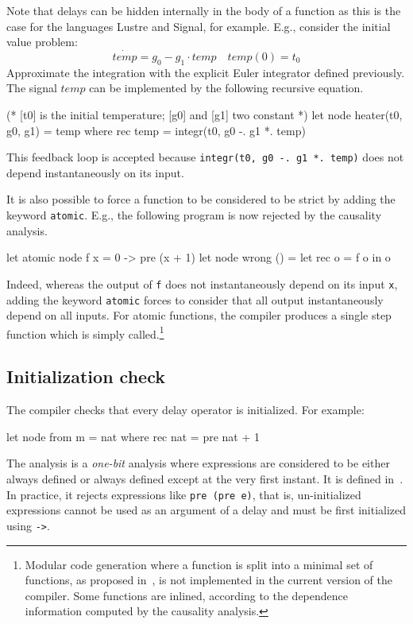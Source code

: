 \documentclass[11pt,titlepage,twoside]{report}
\newcommand{\lustre}{{\sf Lustre}}
\newcommand{\signal}{{\sf Signal}}
\begin{document}
\newcommand{\temp}{\mathit{temp}}

Note that delays can be hidden internally in the body of a function as
this is the case for the languages \lustre{} and \signal, for
example. E.g., consider the initial value problem:
\[
\dot{\temp} = g_0 - g_1 \cdot \temp \quad \temp(0) = t_0
\]
Approximate the integration with the explicit Euler integrator defined previously. The
signal $\temp$ can be implemented by the following recursive equation.

\begin{runverbatim}[withresult,include=integr]
(* [t0] is the initial temperature; [g0] and [g1] two constant *)
let node heater(t0, g0, g1) = temp where
  rec temp = integr(t0, g0 -. g1 *. temp)
\end{runverbatim}
This feedback loop is accepted because \verb+integr(t0, g0 -. g1 *. temp)+ does
not depend instantaneously on its input.

It is also possible to force a function to be considered to be strict
by adding the keyword \texttt{atomic}. E.g., the following program is
now rejected by the causality analysis.
%
\begin{runverbatim}
let atomic node f x = 0 -> pre (x + 1)
let node wrong () =
  let rec o = f o in o
\end{runverbatim}
%
Indeed, whereas the output of \texttt{f} does not instantaneously
depend on its input \texttt{x}, adding the keyword \texttt{atomic}
forces to consider that all output instantaneously depend on all
inputs. For atomic functions, the compiler produces a single step
function which is simply called.\footnote{Modular code generation
  where a function is split into a minimal set of functions, as
  proposed in~\cite{lucy:emsoft09,lustre:tripakis-popl09}, is not
  implemented in the current version of the compiler. Some functions
  are inlined, according to the dependence information
  computed by the causality analysis.}

\subsection{Initialization check}
\label{initialisation-check}
The compiler checks that every delay operator is initialized. For
example:
\begin{runverbatim}
let node from m = nat where
  rec nat = pre nat + 1
\end{runverbatim}
The analysis is a {\em one-bit} analysis where expressions are
considered to be either always defined or always defined except at the
very first instant.  It is defined in~\cite{lucy:sttt04}. In
practice, it rejects expressions like \verb-pre (pre e)-, that is,
un-initialized expressions cannot be used as an argument of a delay
and must be first initialized using \verb+->+.
\end{document}
